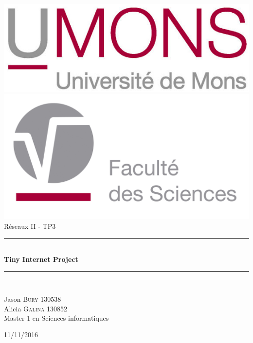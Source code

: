 \begin{titlepage}
\begin{center}
\includegraphics[scale=1.50]{UMONS.jpg}\\[0.4cm]
\includegraphics[scale=0.30]{FS_Logo.jpg}\\[3cm]
{\huge Réseaux II - TP3}\\
\vspace{0.9mm}
\rule{9.5cm}{0.5mm}\\[0.5cm]
{\huge \bfseries Tiny Internet Project}\\[0.2cm]
\rule{9.5cm}{0.5mm}\\[7cm]
      \begin{flushleft} \large
        Jason \textsc{Bury} 130538\\
        Alicia \textsc{Galina} 130852\\
        Master 1 en Sciences informatiques\\
      \end{flushleft}
   \vfill
  {\large 11/11/2016}
\end{center}
\end{titlepage}